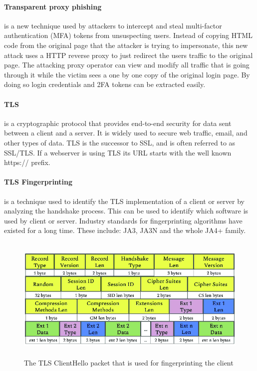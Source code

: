 \documentclass[12pt]{scrbook}
\begin{document}
\paragraph{Transparent proxy phishing} is a new technique used by attackers to intercept and steal
multi-factor authentication (MFA) tokens from unsuspecting users. Instead of
copying HTML code from the original page that the attacker is trying to
impersonate, this new attack uses a HTTP reverse proxy to just redirect the
users traffic to the original page. The attacking proxy operator can view and
modify all traffic that is going through it while the victim sees a one by one
copy of the original login page. By doing so login credentials and 2FA tokens
can be extracted easily.

\paragraph{TLS} is a cryptographic protocol that provides
end-to-end security for data sent between a client and a server. It is widely
used to secure web traffic, email, and other types of data. TLS is the successor
to SSL, and is often referred to as SSL/TLS. If a webserver is using TLS its URL
starts with the well known https:// prefix.

\paragraph{TLS Fingerprinting} is a technique used to identify the TLS implementation of a client or server by
analyzing the handshake process. This can be used to identify which software is
used by client or server. Industry standards for fingerprinting algorithms have
existed for a long time. These include: JA3, JA3N and the whole JA4+ family.
\begin{figure}[!h] \centering
  \includegraphics[height=6cm]{./images/client_hello_packet.png}
  \caption{The TLS ClientHello packet that is used for fingerprinting the client}
\end{figure}
\end{document}
